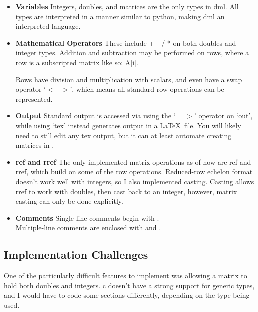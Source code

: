 \documentclass[a4paper,11pt]{article}
\begin{document}
\begin{itemize}
    
    \item[] \textbf{Variables} \newline
        Integers, doubles, and matrices are the only types in dml. All types are interpreted
        in a manner similar to python, making dml an interpreted language.
    
    \item[] \textbf{Mathematical Operators} \newline
        These include + - / * on both doubles and integer types. Addition and subtraction
        may be performed on rows, where a row is a subscripted matrix like so: A[i].
        
        Rows have division and multiplication with scalars, and even have a swap operator
        `$<$$-$$>$', which means all standard row operations can be represented.
        
    \item[] \textbf{Output} \newline
        Standard output is accessed via using the `$=>$' operator on `out', while
        using `tex' instead generates output in a \LaTeX\ file. You will likely need to still
        edit any tex output, but it can at least automate creating matrices in \LaTex.
        
    \item[] \textbf{ref and rref} \newline
        The only implemented matrix operations as of now are ref and rref, which build on
        some of the row operations. Reduced-row echelon format doesn't work well with integers,
        so I also implemented casting. Casting allows rref to work with doubles, then cast back
        to an integer, however, matrix casting can only be done explicitly.
    
    \item[] \textbf{Comments} \newline
        Single-line comments begin with {\symb{//}}. \\Multiple-line comments are  enclosed with {\symb{/*}} and {\symb{*/}}.
    
\end{itemize}

\subsection*{Implementation Challenges}
One of the particularly difficult features to implement was allowing a matrix to hold both
doubles and integers. c doesn't have a strong support for generic types, and I would have
to code some sections differently, depending on the type being used.
\end{document}
